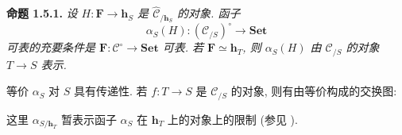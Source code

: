 \medskip
\noindent{}\textbf{命题 1.5.1.}
\textit{设 \(H:\mathbf F\to\mathbf h_S\) 是
\(\widehat{\mathscr C}_{/\mathbf h_S}\) 的对象.
函子
\[
  \alpha_S(H):(\mathscr C_{/S})^{\circ}\longrightarrow\mathbf{Set}
\]
可表的充要条件是 \(\mathbf F:\mathscr C^{\circ}\to\mathbf{Set}\) 可表.
若 \(\mathbf F\simeq\mathbf h_T\), 则 \(\alpha_S(H)\) 由
\(\mathscr C_{/S}\) 的对象 \(T\to S\) 表示.}

等价 \(\alpha_S\) 对 \(S\) 具有传递性.
若 \(f:T\to S\) 是 \(\mathscr C_{/S}\) 的对象, 则有由等价构成的交换图:

\begin{center}
  
\end{center}

这里 \(\alpha_{S/\mathbf h_T}\) 暂表示函子 \(\alpha_S\)
在 \(\mathbf h_T\) 上的对象上的限制 (参见 ).
